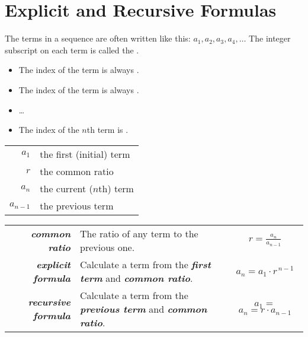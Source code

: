 \section{Explicit and Recursive Formulas}

The terms in a sequence are often written like this:
$ a_1, a_2, a_3, a_4, \dots$
The integer subscript on each term is called the .
\begin{itemize}[nosep]
    \item The index of the  term is always .
    \item The index of the  term is always .
    \item \dots
    \item The index of the $n$th term is .
\end{itemize}

\begin{center}
\begin{tcolorbox}[width=4in]
    \centering
    {
        \large
        \begin{tabular}{r|l}
            $a_1$ & the first (initial) term \\
            $r$ & the common ratio \\
            $a_{n}$ & the current ($n$th) term \\
            $a_{n-1}$ & the previous term \\
        \end{tabular}
    }
\end{tcolorbox}
\end{center}


\begin{tcolorbox}
    \centering
    {
        \renewcommand{\arraystretch}{2}
        \begin{tabular}{|r|p{3in}|c|}
            \hline
            {\large\bfseries\itshape common ratio}
                & The ratio of any term to the previous one.
                & {\large $r = \frac{a_n}{a_{n-1}}$ }
                \\
            {\large\bfseries\itshape explicit formula}
                & Calculate a term from the {\bfseries\itshape first term} and {\bfseries\itshape common ratio}.
                & {$a_n = a_1 \cdot r^{\,n-1}$ }
                \\
            {\large\bfseries\itshape recursive formula}
                & Calculate a term from the {\bfseries\itshape previous term} and {\bfseries\itshape common ratio}.
                & 
                    $a_1 = $\underline{\phantom{99999}}
                    \quad
                    $a_n = r \cdot a_{n-1}$
                \\
            \hline
        \end{tabular}
    }
\end{tcolorbox}

